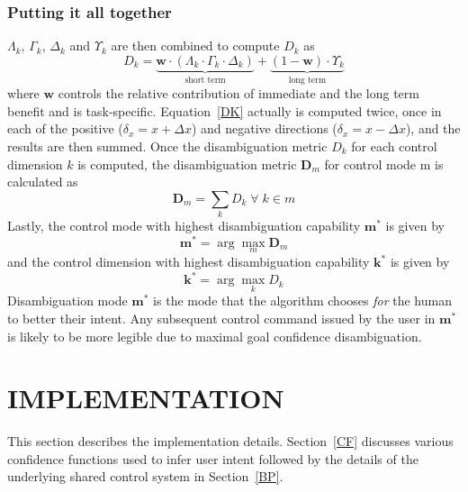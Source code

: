 \documentclass[conference]{IEEEtran}
\newcommand{\argmax}{\arg\!\max}
\begin{document}
\subsubsection*{Putting it all together}
$\Lambda_{k}$, $\Gamma_{k}$, $\Delta_{k}$ and $\Upsilon_{k}$ are then combined to compute $D_{k}$ as 
\begin{equation}\label{DK}
D_{k} = \underbrace{\boldsymbol{w}\cdot(\Lambda_{k}\cdot \Gamma_{k}\cdot \Delta_{k})}_{\text{short term}} + \underbrace{(1 - \boldsymbol{w})\cdot \Upsilon_{k}}_{\text{long term}}
\end{equation}
where $\boldsymbol{w}$ controls the relative contribution of immediate and the long term benefit and is task-specific. Equation~\ref{DK} actually is computed twice, once in each of the positive ($\delta_x = x + \Delta x$) and negative directions ($\delta_x = x - \Delta x$), and the results are then summed. 
Once the disambiguation metric $D_k$ for each control dimension $k$ is computed, the disambiguation metric $\boldsymbol{D}_m$ for control mode m is calculated as 
\begin{equation*}
\boldsymbol{D}_m = \sum_{k} D_{k} \; \forall \; k \in m
\end{equation*}
Lastly, the control mode with highest disambiguation capability $\boldsymbol{m}^*$ is given by
\begin{equation*}
\boldsymbol{m}^* = \argmax_m  \boldsymbol{D}_{m}
\end{equation*}
 and the control dimension with highest disambiguation capability $\boldsymbol{k}^{*}$ is given by
\begin{equation*}
\boldsymbol{k}^* = \argmax_k D_k
\end{equation*}
Disambiguation mode $\boldsymbol{m}^{*}$ is the mode that the algorithm chooses \textit{for} the human to better their intent. Any subsequent control command issued by the user in $\boldsymbol{m}^*$ is likely to be more legible due to maximal goal confidence disambiguation.

\section{IMPLEMENTATION}
This section describes the implementation details. Section~\ref{CF} discusses various confidence functions used to infer user intent followed by the details of the underlying shared control system in Section~\ref{BP}.
\end{document}
